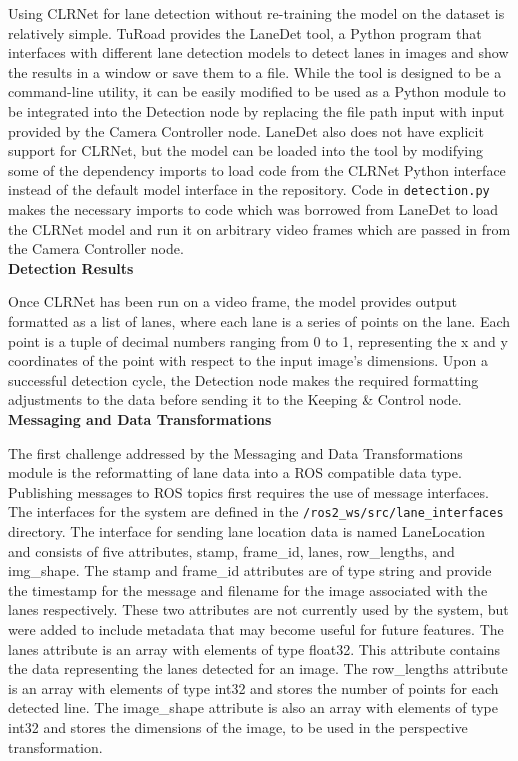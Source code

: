 \documentclass[titlepage, draft]{article}
\begin{document}
{Using CLRNet for lane detection without re-training the model on the dataset is relatively simple.
TuRoad provides the LaneDet \cite{LaneDet} tool, a Python program that interfaces with different lane detection models
to detect lanes in images and show the results in a window or save them to a file.
While the tool is designed to be a command-line utility, it can be easily modified to be used as a Python module
to be integrated into the Detection node by replacing the file path input with input provided by the Camera Controller node.
LaneDet also does not have explicit support for CLRNet, but the model can be loaded into the tool by modifying some of
the dependency imports to load code from the CLRNet Python interface instead of the default model interface in the repository.
Code in \texttt{detection.py} makes the necessary imports to code which was borrowed from LaneDet to load the
CLRNet model and run it on arbitrary video frames which are passed in from the Camera Controller node.
\\

\textbf{Detection Results}

Once CLRNet has been run on a video frame, the model provides output formatted as a list of lanes, where each lane is
a series of points on the lane.
Each point is a tuple of decimal numbers ranging from 0 to 1, representing the x and y coordinates of the point with
respect to the input image's dimensions.
Upon a successful detection cycle, the Detection node makes the required formatting adjustments to the data before sending
it to the Keeping \& Control node.
\\


\textbf{Messaging and Data Transformations}


The first challenge addressed by the Messaging and Data Transformations module is the reformatting of lane data into a ROS compatible data type. Publishing messages to ROS topics first requires the use of message interfaces. The interfaces for the system are defined in the \texttt{/ros2\_ws/src/lane\_interfaces} directory. The interface for sending lane location data is named LaneLocation and consists of five attributes, stamp, frame\_id, lanes, row\_lengths, and img\_shape. The stamp and frame\_id attributes are of type string and provide the timestamp for the message and filename for the image associated with the lanes respectively. These two attributes are not currently used by the system, but were added to include metadata that may become useful for future features. The lanes attribute is an array with elements of type float32. This attribute contains the data representing the lanes detected for an image. The row\_lengths attribute is an array with elements of type int32 and stores the number of points for each detected line. The image\_shape attribute is also an array with elements of type int32 and stores the dimensions of the image, to be used in the perspective transformation.

}
\end{document}
